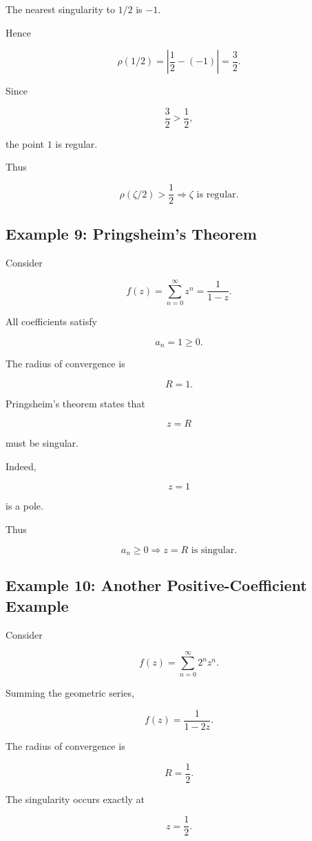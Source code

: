 \documentclass[12pt,a4paper]{article}
\theoremstyle{notespace}
\begin{document}
The nearest singularity to \(1/2\) is \(-1\).

Hence

\[
\rho(1/2)
=
\left|
\frac12-(-1)
\right|
=
\frac32.
\]

Since

\[
\frac32>\frac12,
\]

the point \(1\) is regular.

Thus

\[
\boxed{
	\rho(\zeta/2)>\frac12
	\Longrightarrow
	\zeta
	\text{ is regular}.
}
\]

\bigskip

\subsection{Example 9: Pringsheim's Theorem}

Consider

\[
f(z)
=
\sum_{n=0}^{\infty}z^n
=
\frac1{1-z}.
\]

All coefficients satisfy

\[
a_n=1\ge0.
\]

The radius of convergence is

\[
R=1.
\]

Pringsheim's theorem states that

\[
z=R
\]

must be singular.

Indeed,

\[
z=1
\]

is a pole.

Thus

\[
\boxed{
	a_n\ge0
	\Longrightarrow
	z=R
	\text{ is singular}.
}
\]

\bigskip

\subsection{Example 10: Another Positive-Coefficient Example}

Consider

\[
f(z)
=
\sum_{n=0}^{\infty}
2^n z^n.
\]

Summing the geometric series,

\[
f(z)
=
\frac1{1-2z}.
\]

The radius of convergence is

\[
R=\frac12.
\]

The singularity occurs exactly at

\[
z=\frac12.
\]
\end{document}
